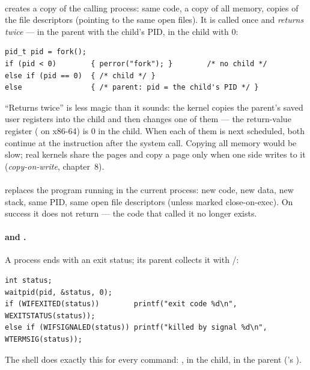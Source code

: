 \paragraph{} creates a copy of the calling process: same code,
a copy of all memory, copies of the file descriptors (pointing to the
same open files). It is called once and \emph{returns twice} --- in the
parent with the child's PID, in the child with 0:

\begin{lstlisting}
pid_t pid = fork();
if (pid < 0)        { perror("fork"); }        /* no child */
else if (pid == 0)  { /* child */ }
else                { /* parent: pid = the child's PID */ }
\end{lstlisting}

``Returns twice'' is less magic than it sounds: the kernel copies the
parent's saved user registers into the child and then changes one of
them --- the return-value register ( on x86-64) is 0 in the
child. When each of them is next scheduled, both continue at the
instruction after the system call. Copying all memory would be slow; real
kernels share the pages and copy a page only when one side writes to it
(\emph{copy-on-write}, chapter~8).

\paragraph{} replaces the program running in the current
process: new code, new data, new stack, same PID, same open file
descriptors (unless marked close-on-exec). On success it does not return
--- the code that called it no longer exists.

\paragraph{ and .} A process ends with an
exit status; its parent collects it with /:

\begin{lstlisting}
int status;
waitpid(pid, &status, 0);
if (WIFEXITED(status))        printf("exit code %d\n", WEXITSTATUS(status));
else if (WIFSIGNALED(status)) printf("killed by signal %d\n", WTERMSIG(status));
\end{lstlisting}

The shell does exactly this for every command: , 
in the child,  in the parent ('s ).

